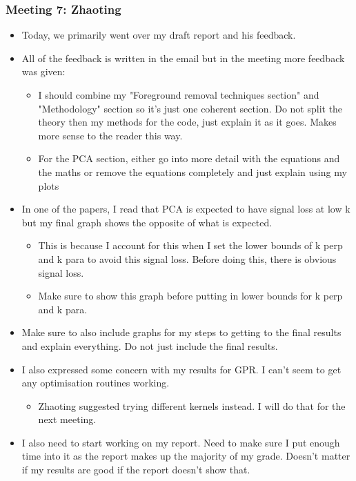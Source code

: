 \subsubsection{Meeting 7: Zhaoting}

\begin{itemize}
    \item Today, we primarily went over my draft report and his feedback.
    \item All of the feedback is written in the email but in the meeting more feedback was given:
\begin{itemize}
    \item I should combine my "Foreground removal techniques section" and "Methodology" section so it's just one coherent section. Do not split the theory then my methods for the code, just explain it as it goes. Makes more sense to the reader this way.
    \item For the PCA section, either go into more detail with the equations and the maths or remove the equations completely and just explain using my plots
\end{itemize}
\item In one of the papers, I read that PCA is expected to have signal loss at low k but my final graph shows the opposite of what is expected.
\begin{itemize}
    \item This is because I account for this when I set the lower bounds of k perp and k para to avoid this signal loss. Before doing this, there is obvious signal loss.
    \item Make sure to show this graph before putting in lower bounds for k perp and k para.
\end{itemize}
\item Make sure to also include graphs for my steps to getting to the final results and explain everything. Do not just include the final results.
\item I also expressed some concern with my results for GPR. I can't seem to get any optimisation routines working.
\begin{itemize}
    \item Zhaoting suggested trying different kernels instead. I will do that for the next meeting.
\end{itemize}
\item I also need to start working on my report. Need to make sure I put enough time into it as the report makes up the majority of my grade. Doesn't matter if my results are good if the report doesn't show that.
\end{itemize}